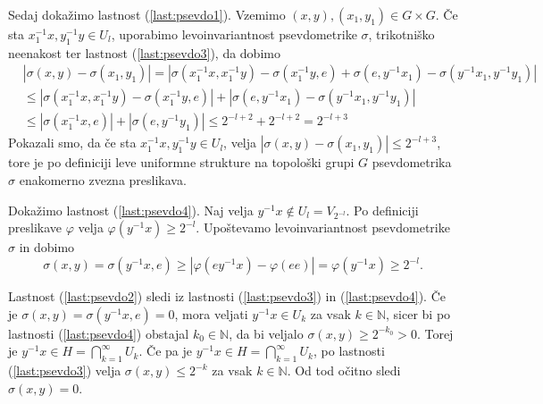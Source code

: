 \documentclass[mat1]{fmfdelo}
\newcommand{\N}{\mathbb N}
\begin{document}
\begin{dokaz}
Sedaj dokažimo lastnost (\ref{last:psevdo1}). Vzemimo $(x, y), (x_1,y_1) \in G \times G$. Če sta $x_1^{-1}x, y_1^{-1}y \in U_l$, uporabimo levoinvariantnost psevdometrike $\sigma$, trikotniško neenakost ter lastnost (\ref{last:psevdo3}), da dobimo
\begin{align*}
&|\sigma(x, y) - \sigma(x_1, y_1)| = |\sigma(x_1^{-1}x, x_1^{-1}y) - \sigma(x_1^{-1}y, e) + \sigma(e, y^{-1}x_1) - \sigma(y^{-1}x_1, y^{-1}y_1)| \\
&\leq |\sigma(x_1^{-1}x, x_1^{-1}y) - \sigma(x_1^{-1}y, e)| + |\sigma(e, y^{-1}x_1) - \sigma(y^{-1}x_1, y^{-1}y_1)| \\
&\leq |\sigma(x_1^{-1}x, e)| + |\sigma(e, y^{-1}y_1)| \leq 2^{-l+2} + 2^{-l+2} = 2^{-l+3}
\end{align*}
Pokazali smo, da če sta $x_1^{-1}x, y_1^{-1}y \in U_l$, velja $|\sigma(x, y) - \sigma(x_1, y_1)| \leq 2^{-l+3}$, tore je po definiciji leve uniformne strukture na topološki grupi $G$ psevdometrika $\sigma$ enakomerno zvezna preslikava.

Dokažimo lastnost (\ref{last:psevdo4}). Naj velja $y^{-1}x \notin U_l = V_{2^{-l}}$. Po definiciji preslikave $\varphi$ velja $\varphi(y^{-1}x) \geq 2^{-l}$. Upoštevamo levoinvariantnost psevdometrike $\sigma$ in dobimo
\[ \sigma(x, y) = \sigma(y^{-1}x, e) \geq |\varphi(ey^{-1}x) - \varphi(ee)| = \varphi(y^{-1}x) \geq 2^{-l}. \]

Lastnost (\ref{last:psevdo2}) sledi iz lastnosti (\ref{last:psevdo3}) in (\ref{last:psevdo4}). Če je $\sigma(x, y) = \sigma(y^{-1}x, e) = 0$, mora veljati $y^{-1}x \in U_k$ za vsak $k \in \N$, sicer bi po lastnosti (\ref{last:psevdo4}) obstajal $k_0 \in \N$, da bi veljalo $\sigma(x, y) \geq 2^{-k_0} > 0$. Torej je $y^{-1}x \in H = \bigcap_{k=1}^\infty U_k$. Če pa je $y^{-1}x \in H = \bigcap_{k=1}^\infty U_k$, po lastnosti (\ref{last:psevdo3}) velja $\sigma(x,y) \leq 2^{-k}$ za vsak $k \in \N$. Od tod očitno sledi $\sigma(x, y) = 0$.


\end{dokaz}
\end{document}
